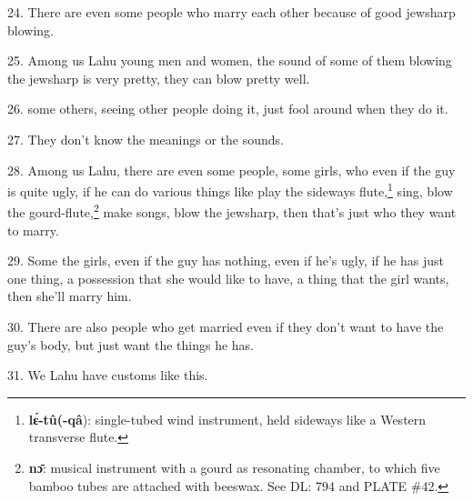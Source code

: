 24. There are even some people who marry each other because of good jewsharp blowing.

25. Among us Lahu young men and women, the sound of some of them blowing the jewsharp
is very pretty, they can blow pretty well.

26.  some others, seeing other people doing it, just fool
around when they do it.

27. They don't know the meanings or the sounds.

28. Among us Lahu, there are even some people, some girls, who even if the guy
is quite ugly, if he can do various things like play the sideways flute,\footnote{\textbf{lɛ́-tû(-qâ}): single-tubed wind instrument, held sideways like a Western transverse flute.} sing,
blow the gourd-flute,\footnote{\textbf{nɔ̄}: musical instrument with a gourd as resonating chamber, to which five bamboo tubes are attached with beeswax. See DL: 794 and PLATE \#42.} make songs, blow the jewsharp, then that's just who they
want to marry.

29. Some the girls, even if the guy has nothing, even if he's ugly, if he has just
one thing, a possession that she would like to have, a thing that the girl wants,
then she'll marry him.

30. There are also people who get married even if they don't want to have the guy's
body, but just want the things he has.

31. We Lahu have customs like this.

